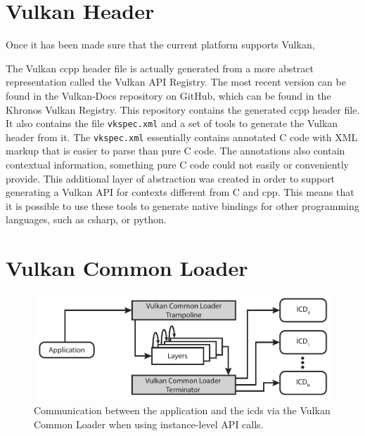 


  \section{Vulkan Header}
  \label{sec:VulkanHeader}
    Once it has been made sure that the current platform supports Vulkan,

    The Vulkan \gls{ccpp} header file is actually generated from a more abstract representation called the Vulkan API Registry. The most recent version can be found in the Vulkan-Docs repository on GitHub, which can be found in the Khronos Vulkan Registry\cite{vulkanregistry}. This repository contains the generated \gls{ccpp} header file. It also contains the file \lstinline{vkspec.xml} and a set of tools to generate the Vulkan header from it. The \lstinline{vkspec.xml} essentially contains annotated C code with XML markup that is easier to parse than pure C code. The annotations also contain contextual information, something pure C code could not easily or conveniently provide. This additional layer of abstraction was created in order to support generating a Vulkan API for contexts different from C and \gls{cpp}. This means that it is possible to use these tools to generate native bindings for other programming languages, such as \gls{csharp}, or \gls{python}.


  \section{Vulkan Common Loader}
  \label{sec:VulkanLoader}

    \begin{figure}
      \includegraphics{Main/Images/VulkanLoaderInstanceLayers}
      \centering
      \caption{Communication between the application and the \glspl{icd} via the Vulkan Common Loader when using instance-level API calls.}
      \label{fig:VulkanLoaderWithInstanceLayers}
    \end{figure}

